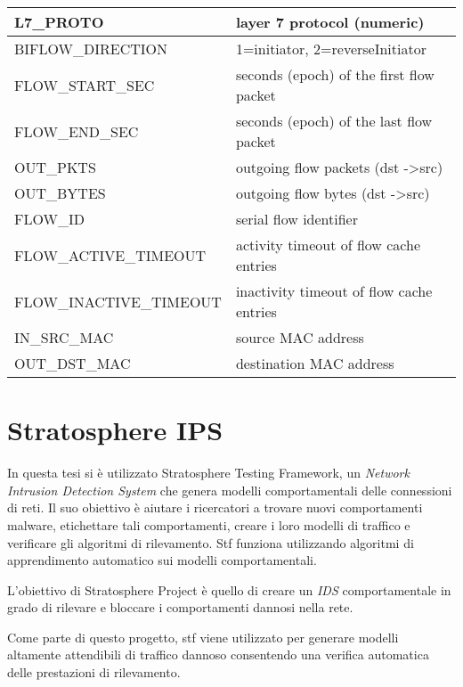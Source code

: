 \documentclass[../main.tex]{subfiles}
\begin{document}
\begin{table}[H]
\begin{tabular}{|l|l|}
L7\_PROTO                            & layer 7 protocol (numeric)                    \\ \hline
BIFLOW\_DIRECTION                    & 1=initiator, 2=reverseInitiator               \\ \hline
FLOW\_START\_SEC                     & seconds (epoch) of the first flow packet      \\ \hline
FLOW\_END\_SEC                       & seconds (epoch) of the last flow packet       \\ \hline
OUT\_PKTS                            & outgoing flow packets (dst -\textgreater src) \\ \hline
OUT\_BYTES                           & outgoing flow bytes (dst -\textgreater src)   \\ \hline
FLOW\_ID                             & serial flow identifier                        \\ \hline
FLOW\_ACTIVE\_TIMEOUT                & activity timeout of flow cache entries        \\ \hline
FLOW\_INACTIVE\_TIMEOUT              & inactivity timeout of flow cache entries      \\ \hline
IN\_SRC\_MAC                         & source MAC address                            \\ \hline
OUT\_DST\_MAC                        & destination MAC address                       \\ \hline
\end{tabular}
\end{table}

\section{Stratosphere IPS}
In questa tesi si è utilizzato Stratosphere Testing Framework, un \textit{Network Intrusion Detection System} che genera modelli comportamentali delle connessioni di reti. Il suo obiettivo è aiutare i ricercatori a trovare nuovi comportamenti malware, etichettare tali comportamenti, creare i loro modelli di traffico e verificare gli algoritmi di rilevamento. Stf funziona utilizzando algoritmi di apprendimento automatico sui modelli comportamentali.

L'obiettivo di Stratosphere Project è quello di creare un \textit{IDS} comportamentale in grado di rilevare e bloccare i comportamenti dannosi nella rete.

Come parte di questo progetto, stf viene utilizzato per generare modelli altamente attendibili di traffico dannoso consentendo una verifica automatica delle prestazioni di rilevamento. \newline
\end{document}
